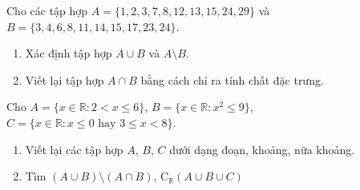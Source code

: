 \begin{bt}%
	Cho  các tập hợp $A=\{1, 2, 3, 7, 8, 12, 13, 15, 24, 29\}$ và $B=\{3, 4, 6, 8, 11, 14, 15, 17, 23, 24\}$.
	\begin{enumerate}
		\item Xác định tập  hợp $A\cup B$ và $A\setminus B$.
		 \item Viết lại tập hợp $A\cap B$ bằng cách chỉ ra tính chất đặc trưng.
	\end{enumerate}
\end{bt}

\begin{bt}%
	Cho $ A=\{x\in\mathbb{R}:2<x\le6\} $, $ B=\{x\in\mathbb{R}:x^2\le9\} $,\\ $  C=\{x\in\mathbb{R}:x\le0 \text{ hay } 3\le x<8\} $.
	\begin{enumerate}
		\item Viết lại các tập hợp $ A $, $ B $, $ C  $ dưới dạng đoạn, khoảng, nữa khoảng.
		\item Tìm $ (A\cup B)\setminus(A\cap B) $, $ \mathrm{C}_\mathbb{R} (A\cup  B\cup C) $
	\end{enumerate}
	 \loigiai{
		\begin{enumerate}
			\item $ A=\left(2;6\right] $, $ B=\left[-3;3\right]  $, $ C=\left(-\infty;0 \right]\cup \left[3;8\right) $.
			\item 
			\begin{itemize}
				\item $  (A\cup B)\setminus(A\cap B)=\left[-3;6\right]\setminus\left(2;3\right]=\left[-3;2\right]\cup \left(3;6\right] $.
				\item Tìm $ \mathrm{C}_\mathbb{R} (A\cup  B\cup C) $.\\
				Ta có  $ (A\cup B\cup C)=\left(-\infty;8\right) $.\\
				Nên suy ra $  \mathrm{C}_\mathbb{R} (A\cup B\cup C)=\left[8;+\infty \right) $.
			\end{itemize}
	\end{enumerate}}
\end{bt}

